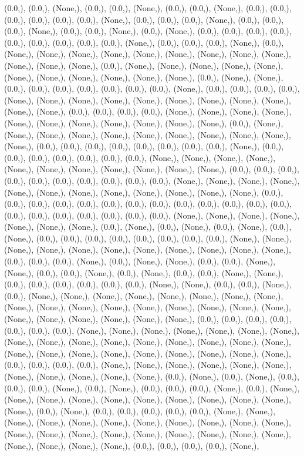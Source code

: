 \documentclass{article}
\begin{document}
(0.0,), (0.0,), (None,), (0.0,), (0.0,), (None,), (0.0,), (0.0,), (None,), (0.0,), (0.0,), (0.0,), (0.0,), (0.0,), (0.0,), (None,), (0.0,), (0.0,), (0.0,), (None,), (0.0,), (0.0,), (0.0,), (None,), (0.0,), (0.0,), (None,), (0.0,), (None,), (0.0,), (0.0,), (0.0,), (0.0,), (0.0,), (0.0,), (0.0,), (0.0,), (0.0,), (None,), (0.0,), (0.0,), (0.0,), (None,), (0.0,), (None,), (None,), (None,), (None,), (None,), (None,), (None,), (None,), (None,), (None,), (None,), (None,), (0.0,), (None,), (None,), (None,), (None,), (None,), (None,), (None,), (None,), (None,), (None,), (None,), (0.0,), (None,), (None,), (0.0,), (0.0,), (0.0,), (0.0,), (0.0,), (0.0,), (0.0,), (None,), (0.0,), (0.0,), (0.0,), (0.0,), (None,), (None,), (None,), (None,), (None,), (None,), (None,), (None,), (None,), (None,), (None,), (0.0,), (0.0,), (0.0,), (0.0,), (None,), (None,), (None,), (None,), (None,), (None,), (None,), (None,), (None,), (None,), (None,), (0.0,), (None,), (None,), (None,), (None,), (None,), (None,), (None,), (None,), (None,), (None,), (None,), (0.0,), (0.0,), (0.0,), (0.0,), (0.0,), (0.0,), (0.0,), (0.0,), (None,), (0.0,), (0.0,), (0.0,), (0.0,), (0.0,), (0.0,), (0.0,), (None,), (None,), (None,), (None,), (None,), (None,), (None,), (None,), (None,), (None,), (None,), (0.0,), (0.0,), (0.0,), (0.0,), (0.0,), (0.0,), (0.0,), (0.0,), (0.0,), (0.0,), (None,), (None,), (None,), (None,), (None,), (None,), (None,), (None,), (None,), (None,), (None,), (None,), (0.0,), (0.0,), (0.0,), (0.0,), (0.0,), (0.0,), (0.0,), (0.0,), (0.0,), (0.0,), (0.0,), (0.0,), (0.0,), (0.0,), (0.0,), (0.0,), (0.0,), (0.0,), (0.0,), (0.0,), (None,), (None,), (None,), (None,), (None,), (None,), (None,), (0.0,), (None,), (0.0,), (None,), (0.0,), (None,), (0.0,), (None,), (0.0,), (0.0,), (0.0,), (0.0,), (0.0,), (0.0,), (0.0,), (0.0,), (None,), (None,), (None,), (None,), (None,), (None,), (None,), (None,), (None,), (None,), (None,), (0.0,), (0.0,), (0.0,), (None,), (0.0,), (None,), (None,), (0.0,), (0.0,), (None,), (None,), (0.0,), (0.0,), (None,), (0.0,), (None,), (0.0,), (0.0,), (None,), (None,), (0.0,), (0.0,), (0.0,), (0.0,), (0.0,), (0.0,), (None,), (None,), (0.0,), (0.0,), (None,), (0.0,), (None,), (None,), (None,), (None,), (None,), (None,), (None,), (None,), (None,), (None,), (None,), (None,), (None,), (None,), (None,), (None,), (None,), (None,), (None,), (None,), (None,), (None,), (None,), (0.0,), (0.0,), (0.0,), (0.0,), (0.0,), (0.0,), (0.0,), (None,), (None,), (None,), (None,), (None,), (None,), (None,), (None,), (None,), (None,), (None,), (None,), (None,), (None,), (None,), (None,), (None,), (None,), (None,), (None,), (None,), (None,), (None,), (None,), (None,), (0.0,), (0.0,), (0.0,), (0.0,), (None,), (None,), (None,), (None,), (None,), (None,), (None,), (None,), (None,), (None,), (None,), (0.0,), (None,), (0.0,), (None,), (0.0,), (0.0,), (0.0,), (None,), (0.0,), (None,), (0.0,), (0.0,), (0.0,), (None,), (0.0,), (None,), (None,), (None,), (None,), (None,), (None,), (None,), (None,), (None,), (None,), (None,), (0.0,), (None,), (0.0,), (0.0,), (0.0,), (0.0,), (0.0,), (None,), (None,), (None,), (None,), (None,), (None,), (None,), (None,), (None,), (None,), (None,), (None,), (None,), (None,), (None,), (None,), (None,), (None,), (None,), (None,), (None,), (None,), (None,), (None,), (0.0,), (0.0,), (0.0,), (0.0,), (None,), 
\end{document}
